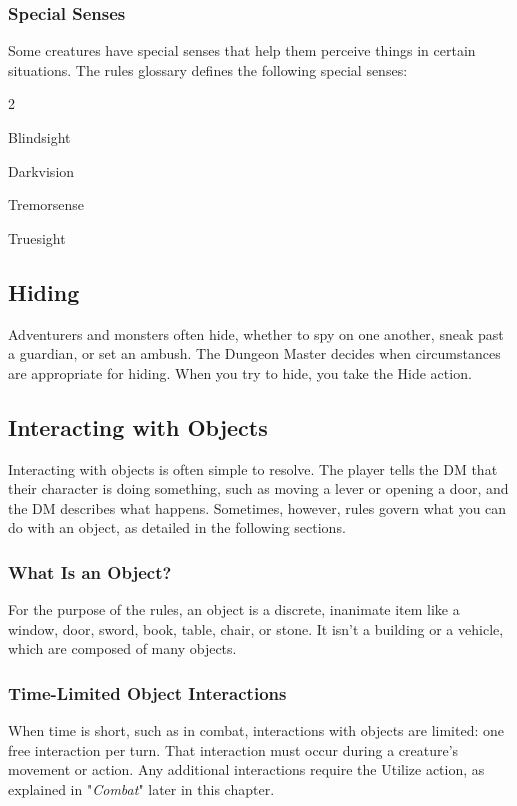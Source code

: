 \documentclass[10pt,a4paper,twoside,bg=print,twocolumn,openany,nodeprecatedcode]{dndbook}
\begin{document}
\subsubsection{Special Senses}
Some creatures have special senses that help them perceive things in certain situations. The rules glossary defines the following special senses:


\begin{itemize}
\begin{multicols}{2}
\item Blindsight
\item Darkvision
\item Tremorsense
\item Truesight
\end{multicols}

\end{itemize}

\subsection{Hiding}
Adventurers and monsters often hide, whether to spy on one another, sneak past a guardian, or set an ambush. The Dungeon Master decides when circumstances are appropriate for hiding. When you try to hide, you take the Hide action.

\subsection{Interacting with Objects}
Interacting with objects is often simple to resolve. The player tells the DM that their character is doing something, such as moving a lever or opening a door, and the DM describes what happens. Sometimes, however, rules govern what you can do with an object, as detailed in the following sections.

\subsubsection{What Is an Object?}
For the purpose of the rules, an object is a discrete, inanimate item like a window, door, sword, book, table, chair, or stone. It isn't a building or a vehicle, which are composed of many objects.

\subsubsection{Time-Limited Object Interactions}
When time is short, such as in combat, interactions with objects are limited: one free interaction per turn. That interaction must occur during a creature's movement or action. Any additional interactions require the Utilize action, as explained in "\textit{Combat}" later in this chapter.
\end{document}
